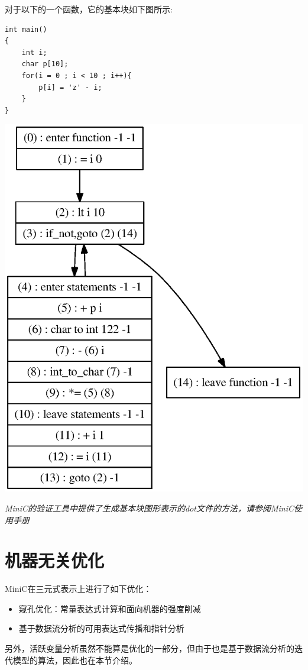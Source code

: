 对于以下的一个函数，它的基本块如下图所示:
\begin{lstlisting}
int main()
{
	int i;
	char p[10];
	for(i = 0 ; i < 10 ; i++){
		p[i] = 'z' - i;
	}
}
\end{lstlisting}
\begin{center}
	\includegraphics[scale=0.5]{basic_block}
\end{center}
{\it \manerrarrow MiniC的验证工具中提供了生成基本块图形表示的dot文件的方法，请参阅MiniC使用手册}\\
\section{机器无关优化}
\label{indepopt}
MiniC在三元式表示上进行了如下优化：
\begin{itemize}
	\item 窥孔优化：常量表达式计算和面向机器的强度削减
	\item 基于数据流分析的可用表达式传播和指针分析
\end{itemize}
另外，活跃变量分析虽然不能算是优化的一部分，但由于也是基于数据流分析的迭代模型的算法，因此也在本节介绍。

